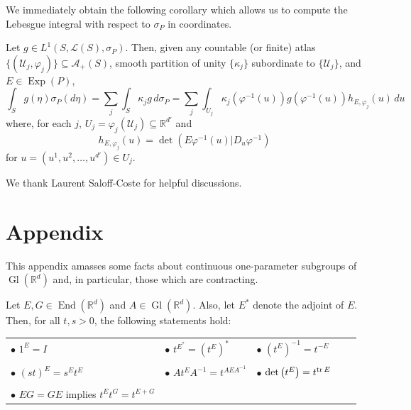 \documentclass[smallextended]{svjour3}
\theoremstyle{remark}
\newcommand\End{\operatorname{End}} %
\newcommand\Gl{\operatorname{Gl}} %
\newcommand\Exp{\operatorname{Exp}}
\renewcommand\det{\operatorname{det}}
\begin{document}
\noindent We immediately obtain the following corollary which allows us to compute the Lebesgue integral with respect to $\sigma_P$ in coordinates.
\begin{corollary}\label{cor:IntegralFormula}
Let $g\in L^1(S,\mathcal{L}(S),\sigma_P)$. Then, given any  countable (or finite) atlas $\{(\mathcal{U}_j,\varphi_j)\}\subseteq\mathcal{A}_+(S)$,  smooth partition of unity $\{\kappa_j\}$ subordinate to $\{\mathcal{U}_j\}$, and $E\in\Exp(P)$,
\begin{equation*}
\int_S g(\eta)\sigma_P(d\eta)=\sum_{j}\int_S \kappa_jg\,d\sigma_P=\sum_j\int_{U_j}\kappa_j(\varphi^{-1}(u))g(\varphi^{-1}(u))h_{E,\varphi_j}(u)\,du
\end{equation*}
where, for each $j$, $U_j=\varphi_j(\mathcal{U}_j)\subseteq\mathbb{R}^{d'}$ and
\begin{equation*}
    h_{E,\varphi_j}(u)=\det(E\varphi^{-1}(u)\vert D_u\varphi^{-1})
\end{equation*}
for $u=(u^1,u^2,\dots,u^{d'})\in U_j$. 
\end{corollary}




\vspace{.4cm}
 We thank Laurent Saloff-Coste for helpful discussions.


\appendix
\section{Appendix}%

This appendix amasses some facts about continuous one-parameter subgroups of $\Gl(\mathbb{R}^d)$ and, in particular, those which are contracting.


\begin{proposition}\label{prop:ContinuousGroupProperties}
Let $E,G\in\End(\mathbb{R}^d)$ and $A\in\Gl(\mathbb{R}^d)$. Also, let $E^*$ denote the adjoint of $E$. Then, for all $t,s>0$, the following statements hold:

\vspace{.3cm}
\begin{tabular}{lllll}
$\bullet$ $1^E=I$ &  $\bullet$ $t^{E^*}=(t^E)^*$ & $\bullet$ $(t^E)^{-1}=t^{-E}$ \\
\vspace{.1cm}\\
$\bullet$ $(st)^E=s^Et^E$ & $\bullet$ $At^EA^{-1}=t^{AEA^{-1}}$&  $\bullet$ $\det\left(t^E\right)=t^{\tr E}$\\
\vspace{.1cm}\\
 $\bullet$ $EG=GE$ implies $t^Et^G=t^{E+G}$ & &
\end{tabular}
\end{proposition}
\end{document}

